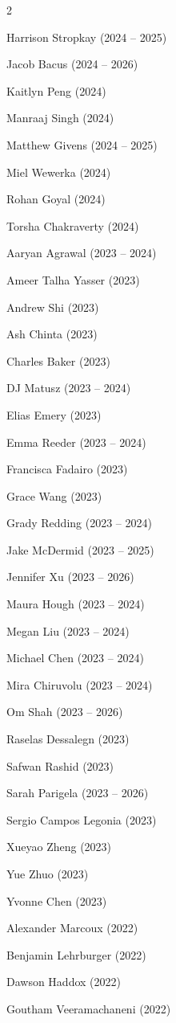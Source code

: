 \documentclass{tufte-book} %
\begin{document}
\begin{fullwidth}
\begin{multicols}{2}
\begin{list}{\quad}{}
\item Harrison Stropkay (2024 -- 2025)
\item Jacob Bacus (2024 -- 2026)
\item Kaitlyn Peng (2024)
\item Manraaj Singh (2024)
\item Matthew Givens (2024 -- 2025)
\item Miel Wewerka (2024)
\item Rohan Goyal (2024)
\item Torsha Chakraverty (2024)
\item Aaryan Agrawal (2023 -- 2024)
\item Ameer Talha Yasser (2023)
\item Andrew Shi (2023)
\item Ash Chinta (2023)
\item Charles Baker (2023)
\item DJ Matusz (2023 -- 2024)
\item Elias Emery (2023)
\item Emma Reeder (2023 -- 2024)
\item Francisca Fadairo (2023)
\item Grace Wang (2023)
\item Grady Redding (2023 -- 2024)
\item Jake McDermid (2023 -- 2025)
\item Jennifer Xu (2023 -- 2026)
\item Maura Hough (2023 -- 2024)
\item Megan Liu (2023 -- 2024)
\item Michael Chen (2023 -- 2024)
\item Mira Chiruvolu (2023 -- 2024)
\item Om Shah (2023 -- 2026)
\item Raselas Dessalegn (2023)
\item Safwan Rashid (2023)
\item Sarah Parigela (2023 -- 2026)
\item Sergio Campos Legonia (2023)
\item Xueyao Zheng (2023)
\item Yue Zhuo (2023)
\item Yvonne Chen (2023)
\item Alexander Marcoux (2022)
\item Benjamin Lehrburger (2022)
\item Dawson Haddox (2022)
\item Goutham Veeramachaneni (2022)

\end{list}
\end{multicols}
\end{fullwidth}
\end{document}
